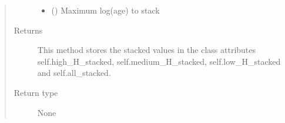 \documentclass[letterpaper,10pt,english]{sphinxmanual}
\begin{document}
\begin{fulllineitems}
\begin{fulllineitems}
\begin{quote}
\begin{description}
\begin{itemize}
\item {} 
 (\sphinxstyleliteralemphasis{\sphinxupquote{, }}) \textendash{} Maximum log(age) to stack

\end{itemize}

\item[{Returns}] \leavevmode
This method stores the stacked values in the class attributes self.high\_H\_stacked,
self.medium\_H\_stacked, self.low\_H\_stacked and self.all\_stacked.

\item[{Return type}] \leavevmode
None

\end{description}\end{quote}

\end{fulllineitems}


\end{fulllineitems}

\end{document}
